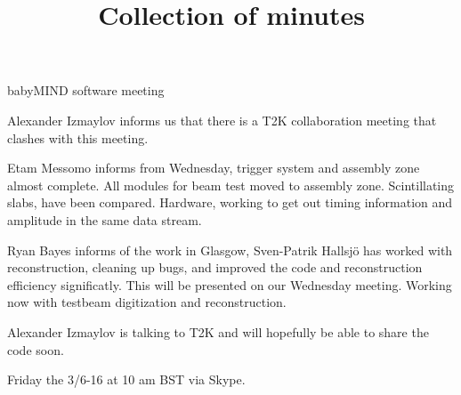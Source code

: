 \documentclass{article}
\title{Collection of minutes}
\author{\LaTeXe}
\begin{document}
\begin{Minutes}{babyMIND software meeting}

\maketitle

Alexander Izmaylov informs us that there is a T2K collaboration meeting that clashes with this meeting.

Etam Messomo informs from Wednesday, trigger system and assembly zone almost complete.
All modules for beam test moved to assembly zone. 
Scintillating slabs, have been compared.
Hardware, working to get out timing information and amplitude in the same data stream.

Ryan Bayes informs of the work in Glasgow, Sven-Patrik Hallsj\"o has worked with reconstruction, cleaning up bugs, and improved the code and reconstruction efficiency significatly. This will be presented on our Wednesday meeting.
Working now with testbeam digitization and reconstruction.

Alexander Izmaylov is talking to T2K and will hopefully be able to share the code soon.

Friday the 3/6-16 at 10 am BST via Skype.

\end{Minutes}
\end{document}
